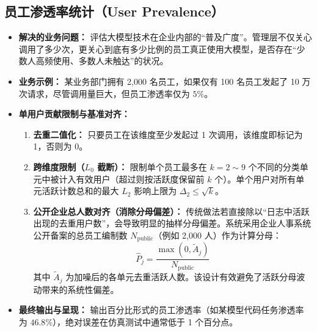 \subsection{员工渗透率统计（User Prevalence）}
\begin{itemize}[leftmargin=2em]
  \item \textbf{解决的业务问题：} 评估大模型技术在企业内部的“普及广度”。管理层不仅关心调用了多少次，更关心到底有多少比例的员工真正使用大模型，是否存在“少数人高频使用、多数人未触达”的状况。
  \item \textbf{业务示例：} 某业务部门拥有 2,000 名员工，如果仅有 100 名员工发起了 10 万次请求，尽管调用量巨大，但员工渗透率仅为 $5\%$。
  \item \textbf{单用户贡献限制与基准对齐：}
  \begin{enumerate}[label=\alph*., leftmargin=1.5em]
    \item \textbf{去重二值化：} 只要员工在该维度至少发起过 1 次调用，该维度即标记为 1，否则为 0。
    \item \textbf{跨维度限制（$L_0$ 截断）：} 限制单个员工最多在 $k=2 \sim 9$ 个不同的分类单元中被计入有效用户（超过则按活跃度保留前 $k$ 个）。单个用户对所有单元活跃计数总和的最大 $L_2$ 影响上限为 $\Delta_2 \le \sqrt{k}$。
    \item \textbf{公开企业总人数对齐（消除分母偏差）：} 传统做法若直接除以“日志中活跃出现的去重用户数”，会导致明显的抽样分母偏差。系统采用企业人事系统公开备案的总员工编制数 $N_{\text{public}}$（例如 2,000 人）作为计算分母：
    \begin{equation}
      \hat{P}_j = \frac{\max(0, \tilde{A}_j)}{N_{\text{public}}}
    \end{equation}
    其中 $\tilde{A}_j$ 为加噪后的各单元去重活跃人数。该设计有效避免了活跃分母波动带来的系统性偏差。
  \end{enumerate}
  \item \textbf{最终输出与呈现：} 输出百分比形式的员工渗透率（如某模型代码任务渗透率为 $46.8\%$），绝对误差在仿真测试中通常低于 1 个百分点。
\end{itemize}


